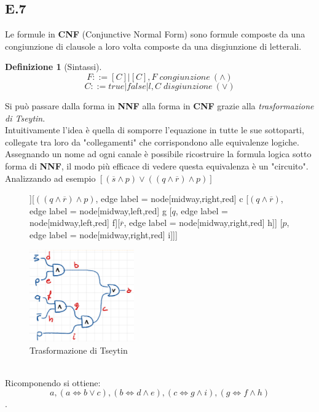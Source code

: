 \documentclass[a4paper]{article}
\newtheorem*{definition}{Definizione}
\begin{document}
\subsection{E.7}
Le formule in \textbf{CNF} (Conjunctive Normal Form) sono formule composte da una congiunzione di clausole a loro volta composte da una disgiunzione di letterali.
\begin{definition}[Sintassi]
	$$F::= [C]|[C],F \; congiunzione \: (\land)$$
	$$C::=true|false|l,C \; disgiunzione \: (\lor)$$
\end{definition}
Si può passare dalla forma in \textbf{NNF} alla forma in \textbf{CNF} grazie alla \textit{trasformazione di Tseytin}.\\
Intuitivamente l'idea è quella di somporre l'equazione in tutte le sue sottoparti, collegate tra loro da "collegamenti" che corrispondono alle equivalenze logiche.
Assegnando un nome ad ogni canale è possibile ricostruire la formula logica sotto forma di \textbf{NNF}, il modo più efficace di vedere questa equivalenza è un "circuito".
Analizzando ad esempio $[(\overline s \land p) \lor ((q \land \overline r) \land p)]$
\begin{figure}[!ht]
\centering
\begin{forest}
	[$(\overline s \land p) \lor ((q \land \overline r) \land p)$[$\overline s \land p$, , edge label = {node[midway,left,red] {b}} [$\overline s$, , edge label = {node[midway,left,red] {d}}][$p$,, edge label = {node[midway,right,red] {e}}]][$((q \land \overline r) \land p)$, edge label = {node[midway,right,red] {c}} [$(q \land \overline r)$, edge label = {node[midway,left,red] {g}} [$q$, edge label = {node[midway,left,red] {f}}][$\overline r$, edge label = {node[midway,right,red] {h}}]] [$p$, edge label = {node[midway,right,red] {i}}]]]
\end{forest}
\includegraphics[width=0.4\textwidth]{./img/E7_circuit}
\caption{Trasformazione di Tseytin} \label{FIG:E7_circuit}
\end{figure}\\
Ricomponendo si ottiene:
$$ a,(a \Leftrightarrow b \lor c), (b \Leftrightarrow d \land e), (c \Leftrightarrow g \land i), (g \Leftrightarrow f \land h)$$.
\end{document}
